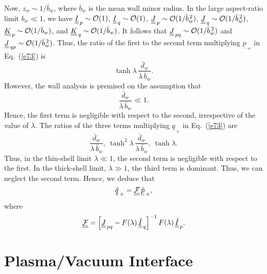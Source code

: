 \documentclass[12pt,prb,aps,notitlepage]{revtex4-1}
\begin{document}
Now, $z_w\sim 1/\bar{b}_w$, where $\bar{b}_w$ is the mean wall minor radius. 
In the large aspect-ratio limit $b_w\ll 1$, we have $\underline{\underline{I}}_{\,p}\sim{\cal O}(1)$, $\underline{\underline{I}}_{\,q}\sim{\cal O}(1)$, 
$\underline{\underline{J}}_{\,p}\sim{\cal O}(1/\bar{b}_w^{\,2})$, $\underline{\underline{J}}_{\,q}\sim{\cal O}(1/\bar{b}_w^{\,2})$, 
$\underline{\underline{K}}_{\,p}\sim{\cal O}(1/\bar{b}_w)$, and $\underline{\underline{K}}_{\,q}\sim{\cal O}(1/\bar{b}_w)$. It follows that
$\underline{\underline{J}}_{\,pq} \sim{\cal O}(1/\bar{b}_w^{\,2})$ and $\underline{\underline{J}}_{\,qp} \sim{\cal O}(1/\bar{b}_w^{\,2})$. 
Thus, the ratio of the first to the second term multiplying $\underline{p}_{\,+}$ in Eq.~(\ref{e73}) is 
\begin{equation}
\tanh\lambda \,\frac{\bar{d}_w}{\lambda\,\bar{b}_w}.
\end{equation}
However, the wall analysis is premised on the assumption that
\begin{equation}
\frac{\bar{d}_w}{\lambda\,\bar{b}_w}\ll 1.
\end{equation}
Hence, the first term is negligible with respect to the second, irrespective of the value of $\lambda$. The
ratios of the three terms multiplying $\underline{q}_{\,+}$ in Eq.~(\ref{e73}) are
\begin{equation}
\frac{\bar{d}_w}{\lambda\,\bar{b}_w},~ \tanh^2\lambda\,\frac{\bar{d}_w}{\lambda\,\bar{b}_w},~ \tanh\lambda.
\end{equation}
Thus, in the thin-shell limit $\lambda\ll 1$, the second term is negligible with respect to the first. In the thick-shell limit, $\lambda\gg 1$, the third term is
dominant. Thus, we can neglect the second term. Hence, we deduce that
\begin{equation}\label{e88}
\underline{\hat{q}}_{\,+} = \underline{\underline{\cal F}}\,\underline{\hat{p}}_{\,+},
\end{equation}
where
\begin{equation}
\underline{\underline{\cal F}}= 
\left[\underline{\underline{J}}_{\,pq}- F(\lambda)\,\underline{\underline{\hat{I}}}_{\,q}\right]^{-1}F(\lambda)\,\underline{\underline{\hat{I}}}_{\,p}.
\end{equation}

\section{Plasma/Vacuum Interface}
\end{document}
